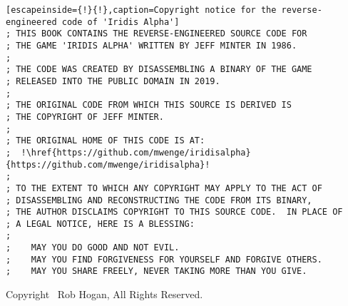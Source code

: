 \clearpage
\lstset{style=6502Style}

\begin{lstlisting}[escapeinside={!}{!},caption=Copyright notice for the reverse-engineered code of 'Iridis Alpha']
; THIS BOOK CONTAINS THE REVERSE-ENGINEERED SOURCE CODE FOR 
; THE GAME 'IRIDIS ALPHA' WRITTEN BY JEFF MINTER IN 1986.
;
; THE CODE WAS CREATED BY DISASSEMBLING A BINARY OF THE GAME
; RELEASED INTO THE PUBLIC DOMAIN IN 2019.
;
; THE ORIGINAL CODE FROM WHICH THIS SOURCE IS DERIVED IS 
; THE COPYRIGHT OF JEFF MINTER.
;
; THE ORIGINAL HOME OF THIS CODE IS AT: 
;  !\href{https://github.com/mwenge/iridisalpha}{https://github.com/mwenge/iridisalpha}!
;
; TO THE EXTENT TO WHICH ANY COPYRIGHT MAY APPLY TO THE ACT OF 
; DISASSEMBLING AND RECONSTRUCTING THE CODE FROM ITS BINARY, 
; THE AUTHOR DISCLAIMS COPYRIGHT TO THIS SOURCE CODE.  IN PLACE OF
; A LEGAL NOTICE, HERE IS A BLESSING:
;
;    MAY YOU DO GOOD AND NOT EVIL.
;    MAY YOU FIND FORGIVENESS FOR YOURSELF AND FORGIVE OTHERS.
;    MAY YOU SHARE FREELY, NEVER TAKING MORE THAN YOU GIVE.
\end{lstlisting}

\vspace*{\fill}
Copyright \textcopyright\ Rob Hogan, All Rights Reserved.

\doclicenseThis
\clearpage
